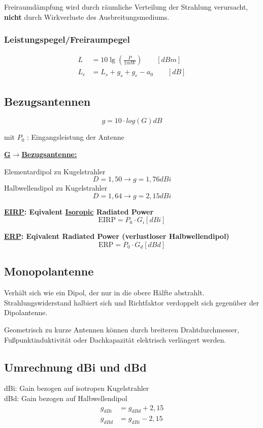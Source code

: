 Freiraumdämpfung wird durch räumliche Verteilung der Strahlung verursacht,
\textbf{nicht} durch Wirkverluste des Ausbreitungsmediums.

\subsubsection{Leistungspegel/Freiraumpegel}
\begin{align*}
	L     & = 10 \lg \left(\frac{P}{1 \si{mW}}\right) \qquad [\si{dBm}] \\
	L_{e} & = L_{s}+g_{s}+g_{e}-a_{0} \qquad [\si{dB}]
\end{align*}

\subsection{Bezugsantennen}
\[
	\boxed{g = 10 \cdot log(G) \si{dB}}
\]

mit $P_0$ : Eingangsleistung der Antenne

\begin{description}
	\item \textbf{\underline{G$\rightarrow$Bezugsantenne:}}

	      Elementardipol  zu Kugelstrahler \[D = 1,50 \rightarrow g = 1,76\si{dBi}\]
	      Halbwellendipol zu Kugelstrahler \[D = 1,64 \rightarrow g = 2,15\si{dBi}\]

	\item \textbf{\underline{EIRP}: Eqivalent \underline{Isoropic} Radiated Power}
	      \[
		      \text{EIRP} = P_0 \cdot G_i [\si{dBi}]
	      \]

	\item \textbf{\underline{ERP}: Eqivalent Radiated Power (verlustloser Halbwellendipol)}
	      \[
		      \text{ERP} = P_0 \cdot G_d [\si{dBd}]
	      \]
\end{description}

\subsection{Monopolantenne}
Verhält sich wie ein Dipol, der nur in die obere Hälfte abstrahlt.
Strahlungswiderstand halbiert sich und Richtfaktor verdoppelt sich gegenüber
der Dipolantenne.

Geometrisch zu kurze Antennen können durch breiteren Drahtdurchmesser,
Fußpunktinduktivität oder Dachkapazität elektrisch verlängert werden.

\subsection{Umrechnung dBi und dBd}
dBi: Gain bezogen auf isotropen Kugelstrahler \\
dBd: Gain bezogen auf Halbwellendipol \\
\begin{align*}
	g_{dBi} & = g_{dBd} + 2,15 \\
	g_{dBd} & = g_{dBi} - 2,15
\end{align*}